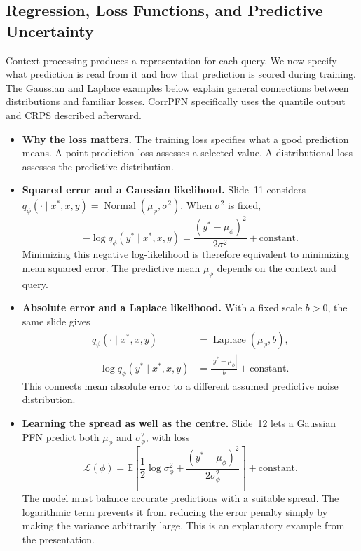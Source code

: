 \documentclass[11pt]{article}
\newenvironment{notes}
  {\begin{itemize}\setlength{\itemsep}{0.45em}\setlength{\parsep}{0pt}}
  {\end{itemize}}
\begin{document}
\subsection{Regression, Loss Functions, and Predictive Uncertainty}
\label{sec:tabicl-regression}

Context processing produces a representation for each query.
We now specify what prediction is read from it and how that
prediction is scored during training. The Gaussian and Laplace
examples below explain general connections between distributions
and familiar losses. CorrPFN specifically uses the quantile
output and CRPS described afterward.

\begin{notes}
    \item \textbf{Why the loss matters.} The training loss specifies
    what a good prediction means. A point-prediction loss assesses
    a selected value. A distributional loss assesses the
    predictive distribution.

    \item \textbf{Squared error and a Gaussian likelihood.}
    Slide~11 considers
    \(q_\phi(\cdot\mid x^\ast,x,y)=
    \operatorname{Normal}(\mu_\phi,\sigma^2)\).
    When \(\sigma^2\) is fixed,
    \[
        -\log q_\phi(y^\ast\mid x^\ast,x,y)
        =
        \frac{(y^\ast-\mu_\phi)^2}{2\sigma^2}
        +\text{constant}.
    \]
    Minimizing this negative log-likelihood is therefore
    equivalent to minimizing mean squared error. The predictive
    mean \(\mu_\phi\) depends on the context and query.

    \item \textbf{Absolute error and a Laplace likelihood.}
    With a fixed scale \(b>0\), the same slide gives
    \[
    \begin{aligned}
        q_\phi(\cdot\mid x^\ast,x,y)
        &=\operatorname{Laplace}(\mu_\phi,b),\\
        -\log q_\phi(y^\ast\mid x^\ast,x,y)
        &=\frac{|y^\ast-\mu_\phi|}{b}+\text{constant}.
    \end{aligned}
    \]
    This connects mean absolute error to a different assumed
    predictive noise distribution.

    \item \textbf{Learning the spread as well as the centre.}
    Slide~12 lets a Gaussian PFN predict both \(\mu_\phi\) and
    \(\sigma_\phi^2\), with loss
    \[
        \mathcal{L}(\phi)
        =
        \mathbb{E}\left[
            \frac{1}{2}\log\sigma_\phi^2
            +\frac{(y^\ast-\mu_\phi)^2}{2\sigma_\phi^2}
        \right]+\text{constant}.
    \]
    The model must balance accurate predictions with a suitable
    spread. The logarithmic term prevents it from reducing the
    error penalty simply by making the variance arbitrarily large.
    This is an explanatory example from the presentation.


\end{notes}
\end{document}
